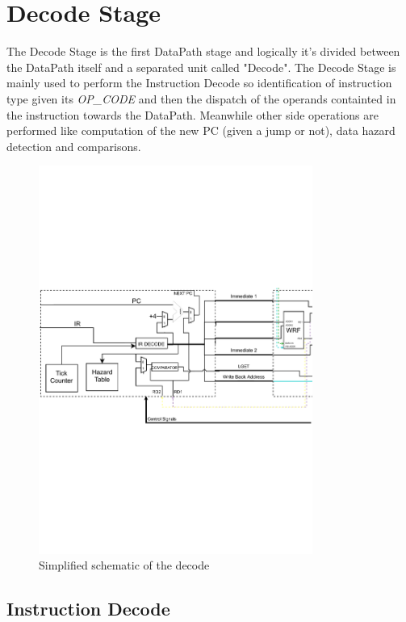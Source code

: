 \chapter{Decode Stage}
\label{sec:decode_stage}

The Decode Stage is the first DataPath stage and logically it's divided between the DataPath itself and a separated unit called "Decode". The Decode Stage is mainly used to perform the Instruction Decode so identification of instruction type given its \emph{OP\_CODE} and then the dispatch of the operands containted in the instruction towards the DataPath. Meanwhile other side operations are performed like computation of the new PC (given a jump or not), data hazard detection and comparisons.

\begin{figure}[H]
  \centering
  \includegraphics[width=0.8\textwidth]{chapters/4_DecodeStage/images/Decode_stage_focus.pdf}
  \caption{Simplified schematic of the decode}
  \label{decode_block_focus}
\end{figure}

\section{Instruction Decode}


